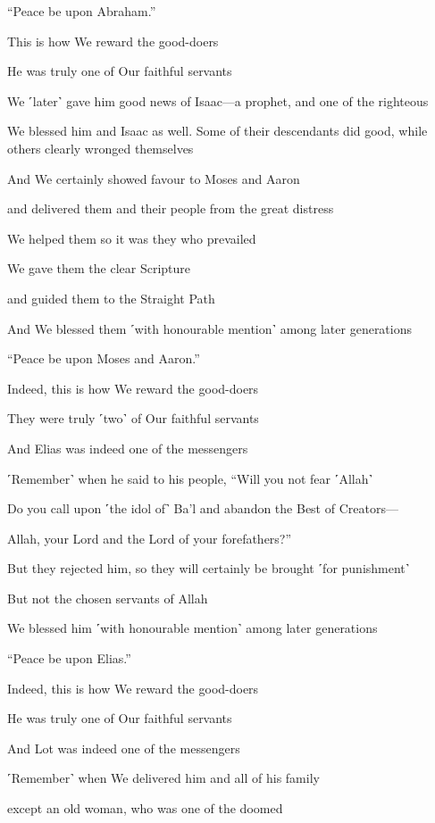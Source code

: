 “Peace be upon Abraham.”

This is how We reward the good-doers

He was truly one of Our faithful servants

We ˹later˺ gave him good news of Isaac—a prophet, and one of the righteous

We blessed him and Isaac as well. Some of their descendants did good, while others clearly wronged themselves

And We certainly showed favour to Moses and Aaron

and delivered them and their people from the great distress

We helped them so it was they who prevailed

We gave them the clear Scripture

and guided them to the Straight Path

And We blessed them ˹with honourable mention˺ among later generations

“Peace be upon Moses and Aaron.”

Indeed, this is how We reward the good-doers

They were truly ˹two˺ of Our faithful servants

And Elias was indeed one of the messengers

˹Remember˺ when he said to his people, “Will you not fear ˹Allah˺

Do you call upon ˹the idol of˺ Ba’l and abandon the Best of Creators—

Allah, your Lord and the Lord of your forefathers?”

But they rejected him, so they will certainly be brought ˹for punishment˺

But not the chosen servants of Allah

We blessed him ˹with honourable mention˺ among later generations

“Peace be upon Elias.”

Indeed, this is how We reward the good-doers

He was truly one of Our faithful servants

And Lot was indeed one of the messengers

˹Remember˺ when We delivered him and all of his family

except an old woman, who was one of the doomed

